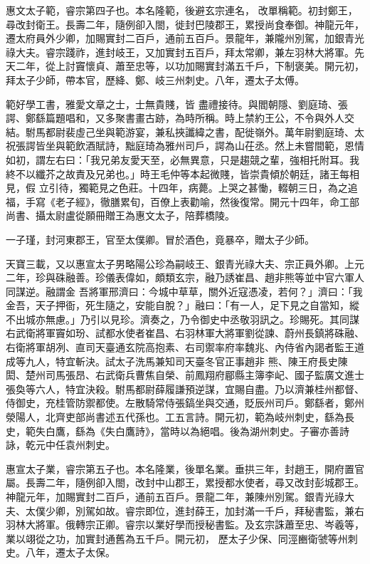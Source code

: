 \begin{pinyinscope}
 惠文太子範，睿宗第四子也。本名隆範，後避玄宗連名，
 改單稱範。初封鄭王，尋改封衛王。長壽二年，隨例卻入閤，徙封巴陵郡王，累授尚食奉御。神龍元年，遷太府員外少卿，加賜實封二百戶，通前五百戶。景龍年，兼隴州別駕，加銀青光祿大夫。睿宗踐祚，進封岐王，又加實封五百戶，拜太常卿，兼左羽林大將軍。先天二年，從上討竇懷貞、蕭至忠等，以功加賜實封滿五千戶，下制褒美。開元初，拜太子少師，帶本官，歷絳、鄭、岐三州刺史。八年，遷太子太傅。



 範好學工書，雅愛文章之士，士無貴賤，皆
 盡禮接待。與閻朝隱、劉庭琦、張諤、鄭繇篇題唱和，又多聚書畫古跡，為時所稱。時上禁約王公，不令與外人交結。駙馬都尉裴虛己坐與範游宴，兼私挾讖緯之書，配徙嶺外。萬年尉劉庭琦、太祝張諤皆坐與範飲酒賦詩，黜庭琦為雅州司戶，諤為山茌丞。然上未嘗間範，恩情如初，謂左右曰：「我兄弟友愛天至，必無異意，只是趨競之輩，強相托附耳。我終不以纖芥之故責及兄弟也。」時王毛仲等本起微賤，皆崇貴傾於朝廷，諸王每相見，假
 立引待，獨範見之色莊。十四年，病薨。上哭之甚慟，輟朝三日，為之追福，手寫《老子經》，徹膳累旬，百僚上表勸喻，然後復常。開元十四年，命工部尚書、攝太尉盧從願冊贈王為惠文太子，陪葬橋陵。



 一子瑾，封河東郡王，官至太僕卿。冒於酒色，竟暴卒，贈太子少師。



 天寶三載，又以惠宣太子男略陽公珍為嗣岐王、銀青光祿大夫、宗正員外卿。上元二年，珍與硃融善。珍儀表偉如，頗類玄宗，融乃誘崔昌、趙非熊等並中官六軍人同謀逆。融謂金
 吾將軍邢濟曰：今城中草草，關外近寇憑凌，若何？」濟曰：「我金吾，天子押衙，死生隨之，安能自脫？」融曰：「有一人，足下見之自當知，縱不出城亦無慮。」乃引以見珍。濟奏之，乃令御史中丞敬羽訊之。珍賜死。其同謀右武衛將軍竇如玢、試都水使者崔昌、右羽林軍大將軍劉從諫、蔚州長鎮將硃融、右衛將軍胡冽、直司天臺通玄院高抱素、右司禦率府率魏兆、內侍省內謁者監王道成等九人，特宜斬決。試太子洗馬兼知司天臺冬官正事趙非
 熊、陳王府長史陳閎、楚州司馬張昂、右武衛兵曹焦自榮、前鳳翔府郿縣主簿李屺、國子監廣文進士張奐等六人，特宜決殺。駙馬都尉薛履謙預逆謀，宜賜自盡。乃以濟兼桂州都督、侍御史，充桂管防禦都使。左散騎常侍張鎬坐與交通，貶辰州司戶。鄭繇者，鄭州滎陽人，北齊吏部尚書述五代孫也。工五言詩。開元初，範為岐州刺史，繇為長史，範失白鷹，繇為《失白鷹詩》，當時以為絕唱。後為湖州刺史。子審亦善詩詠，乾元中任袁州刺史。



 惠宣太子業，睿宗第五子也。本名隆業，後單名業。垂拱三年，封趙王，開府置官屬。長壽二年，隨例卻入閤，改封中山郡王，累授都水使者，尋又改封彭城郡王。神龍元年，加賜實封二百戶，通前五百戶。景龍二年，兼陳州別駕。銀青光祿大夫、太僕少卿，別駕如故。睿宗即位，進封薛王，加封滿一千戶，拜秘書監，兼右羽林大將軍。俄轉宗正卿。睿宗以業好學而授秘書監。及玄宗誅蕭至忠、岑羲等，業以翊從之功，加實封通舊為五千戶。開元初，
 歷太子少保、同涇豳衛虢等州刺史。八年，遷太子太保。




\end{pinyinscope}
